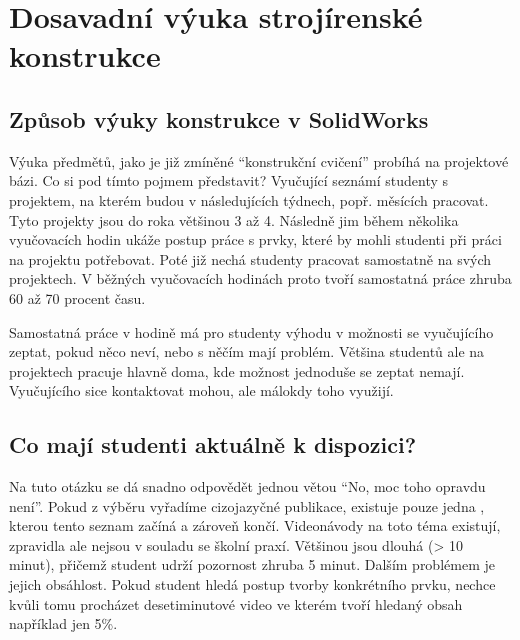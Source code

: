 \chapter{Dosavadní výuka strojírenské konstrukce}
\fxnote[inline=true]{\textcolor{mygreen}{Tato sekce je ještě částečně rozpracovaná, možná ji ještě přeformuluji celou}}

\section{Způsob výuky konstrukce v SolidWorks}
    Výuka předmětů, jako je již zmíněné \enquote{konstrukční cvičení} probíhá na projektové bázi.
    Co si pod tímto pojmem představit?
    Vyučující seznámí studenty s projektem, na kterém budou v následujících týdnech, popř. měsících pracovat. 
    Tyto projekty jsou do roka většinou 3 až 4.
    Následně jim během několika vyučovacích hodin ukáže postup práce s prvky, které by mohli studenti při práci na projektu potřebovat.
    Poté již nechá studenty pracovat samostatně na svých projektech.
    V běžných vyučovacích hodinách proto tvoří samostatná práce zhruba 60 až 70 procent času.

    Samostatná práce v hodině má pro studenty výhodu v možnosti se vyučujícího zeptat, pokud něco neví, nebo s něčím mají problém.
    Většina studentů ale na projektech pracuje hlavně doma, kde možnost jednoduše se zeptat nemají.
    Vyučujícího sice kontaktovat mohou, ale málokdy toho využijí.

\section{Co mají studenti aktuálně k dispozici?}
    Na tuto otázku se dá snadno odpovědět jednou větou \enquote{No, moc toho opravdu není}.
    Pokud z výběru vyřadíme cizojazyčné publikace, existuje pouze jedna , kterou tento seznam začíná a zároveň končí. 
    Videonávody na toto téma existují, zpravidla ale nejsou v souladu se školní praxí.
    Většinou jsou dlouhá (> 10 minut), přičemž student udrží pozornost zhruba 5 minut.
    Dalším problémem je jejich obsáhlost.
    Pokud student hledá postup tvorby konkrétního prvku, nechce kvůli tomu procházet desetiminutové video ve kterém tvoří hledaný obsah například jen 5\%. 
